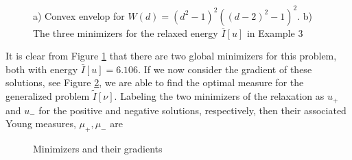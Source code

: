 \documentclass[11pt]{article}
\theoremstyle{plain}
\begin{document}
\begin{figure}[h]
\centering
{}
 \caption{a) Convex envelop for $W(d)= (d^2-1)^2( (d-2)^2-1)^2$. b) The three minimizers for the relaxed energy $\overline{I}[u]$ in  Example 3
 }\label{f:example3}
\end{figure}

It is clear from Figure \ref{f:example3} that there are two global minimizers for this problem, both with energy $\bar{I}[u]=6.106$. If we now consider the gradient of these solutions, see Figure \ref{f:gradientE3}, we are able to find the optimal measure for the generalized problem $\tilde{I}[\nu]$. Labeling the two minimizers of the relaxation as $u_+$ and $u_-$ for the positive and negative solutions, respectively, then their associated Young measures, $\mu_+, \mu_-$ are
\begin{figure}[h]
\centering
{}
 \caption{Minimizers and their gradients
 }\label{f:gradientE3}
\end{figure}
\end{document}
